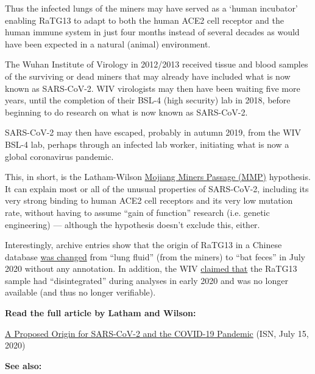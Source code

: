 Thus the infected lungs of the miners may have served as a `human
incubator' enabling RaTG13 to adapt to both the human ACE2 cell receptor
and the human immune system in just four months instead of several
decades as would have been expected in a natural (animal) environment.

The Wuhan Institute of Virology in 2012/2013 received tissue and blood
samples of the surviving or dead miners that may already have included
what is now known as SARS-CoV-2. WIV virologists may then have been
waiting five more years, until the completion of their BSL-4 (high
security) lab in 2018, before beginning to do research on what is now
known as SARS-CoV-2.

SARS-CoV-2 may then have escaped, probably in autumn 2019, from the WIV
BSL-4 lab, perhaps through an infected lab worker, initiating what is
now a global coronavirus pandemic.

This, in short, is the Latham-Wilson
\href{https://www.independentsciencenews.org/commentaries/a-proposed-origin-for-sars-cov-2-and-the-covid-19-pandemic/}{Mojiang
Miners Passage (MMP)} hypothesis. It can explain most or all of the
unusual properties of SARS-CoV-2, including its very strong binding to
human ACE2 cell receptors and its very low mutation rate, without having
to assume ``gain of function'' research (i.e. genetic engineering) ---
although the hypothesis doesn't exclude this, either.

Interestingly, archive entries show that the origin of RaTG13 in a
Chinese database
\href{https://twitter.com/TheSeeker268/status/1286327367019839490}{was
changed} from ``lung fluid'' (from the miners) to ``bat feces'' in July
2020 without any annotation. In addition, the WIV
\href{https://www.thetimes.co.uk/article/seven-year-covid-trail-revealed-l5vxt7jqp}{claimed
that} the RaTG13 sample had ``disintegrated'' during analyses in early
2020 and was no longer available (and thus no longer verifiable).

\textbf{Read the full article by Latham and Wilson:}

\href{https://www.independentsciencenews.org/commentaries/a-proposed-origin-for-sars-cov-2-and-the-covid-19-pandemic/}{A
Proposed Origin for SARS-CoV-2 and the COVID-19 Pandemic} (ISN, July 15,
2020)

\textbf{See also:}

